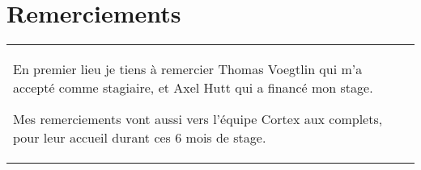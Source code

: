 \chapter*{Remerciements}
\thispagestyle{empty}
\begin{flushleft}
  \begin{tabularx}{14cm}{X}
     En premier lieu je tiens à remercier Thomas Voegtlin qui m'a accepté
     comme stagiaire, et Axel Hutt qui a financé mon stage.

     Mes remerciements vont aussi vers l'équipe Cortex aux complets, pour leur
     accueil durant ces 6 mois de stage.
  \end{tabularx}
\end{flushleft}
